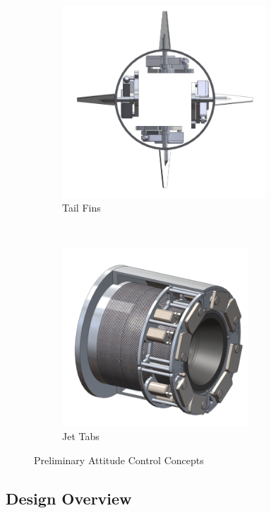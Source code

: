 \begin{figure}[H]
    \centering
    \begin{subfigure}[b]{0.45\textwidth}
        \centering
        \includegraphics[width=3.0in]{AtitudeControl_Figures/fin_design.png}
        \caption{Tail Fins}
    \end{subfigure}
    ~
    \begin{subfigure}[b]{0.45\textwidth}
        \centering
        \includegraphics[width=2.75in]{AtitudeControl_Figures/tab_design.png}
        \caption{Jet Tabs}
    \end{subfigure}
    \caption{Preliminary Attitude Control Concepts \label{fig:atitudectrl_prel}}
\end{figure}

\pagebreak

\subsection{Design Overview}

